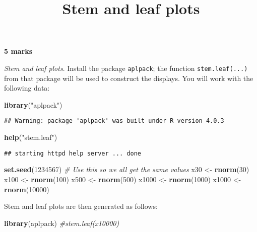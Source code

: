 \documentclass[
]{article}
\title{Stem and leaf plots}
\author{}
\date{\vspace{-2.5em}}
\newenvironment{Shaded}{\begin{snugshade}}{\end{snugshade}}
\newcommand{\CommentTok}[1]{\textcolor[rgb]{0.56,0.35,0.01}{\textit{#1}}}
\newcommand{\DecValTok}[1]{\textcolor[rgb]{0.00,0.00,0.81}{#1}}
\newcommand{\KeywordTok}[1]{\textcolor[rgb]{0.13,0.29,0.53}{\textbf{#1}}}
\newcommand{\NormalTok}[1]{#1}
\newcommand{\StringTok}[1]{\textcolor[rgb]{0.31,0.60,0.02}{#1}}
\begin{document}
\maketitle

\textbf{5 marks}

\emph{Stem and leaf plots}. Install the package \texttt{aplpack}; the
function \texttt{stem.leaf(...)} from that package will be used to
construct the displays. You will work with the following data:

\begin{Shaded}
\begin{Highlighting}[]
\KeywordTok{library}\NormalTok{(}\StringTok{"aplpack"}\NormalTok{)}
\end{Highlighting}
\end{Shaded}

\begin{verbatim}
## Warning: package 'aplpack' was built under R version 4.0.3
\end{verbatim}

\begin{Shaded}
\begin{Highlighting}[]
\KeywordTok{help}\NormalTok{(}\StringTok{"stem.leaf"}\NormalTok{)}
\end{Highlighting}
\end{Shaded}

\begin{verbatim}
## starting httpd help server ... done
\end{verbatim}

\begin{Shaded}
\begin{Highlighting}[]
    \KeywordTok{set.seed}\NormalTok{(}\DecValTok{1234567}\NormalTok{) }\CommentTok{# Use this so we all get the same values}
\NormalTok{    x30 <-}\StringTok{ }\KeywordTok{rnorm}\NormalTok{(}\DecValTok{30}\NormalTok{)}
\NormalTok{    x100 <-}\StringTok{ }\KeywordTok{rnorm}\NormalTok{(}\DecValTok{100}\NormalTok{)}
\NormalTok{    x500 <-}\StringTok{ }\KeywordTok{rnorm}\NormalTok{(}\DecValTok{500}\NormalTok{)}
\NormalTok{    x1000 <-}\StringTok{ }\KeywordTok{rnorm}\NormalTok{(}\DecValTok{1000}\NormalTok{)}
\NormalTok{    x1000 <-}\StringTok{ }\KeywordTok{rnorm}\NormalTok{(}\DecValTok{10000}\NormalTok{)}
\end{Highlighting}
\end{Shaded}

Stem and leaf plots are then generated as follows:

\begin{Shaded}
\begin{Highlighting}[]
    \KeywordTok{library}\NormalTok{(aplpack)}
    \CommentTok{#stem.leaf(x10000)}
\end{Highlighting}
\end{Shaded}
\end{document}
